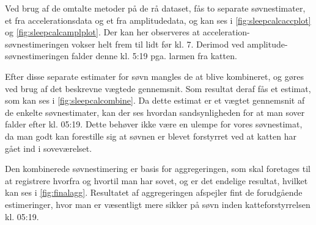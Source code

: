 Ved brug af de omtalte metoder på de rå dataset, fås to separate søvnestimater, et fra accelerationsdata og et fra amplitudedata, og kan ses i \cref{fig:sleepcalcaccplot} og \cref{fig:sleepcalcamplplot}.
Der kan her observeres at acceleration-søvnestimeringen vokser helt frem til lidt før kl. 7.
Derimod ved amplitude-søvnestimeringen falder denne kl. 5:19 pga. larmen fra katten.

Efter disse separate estimater for søvn mangles de at blive kombineret, og gøres ved brug af det beskrevne vægtede gennemsnit.
Som resultat deraf fås et estimat, som kan ses i \cref{fig:sleepcalcombine}.
Da dette estimat er et vægtet gennemsnit af de enkelte søvnestimater, kan der ses hvordan sandsynligheden for at man sover falder efter kl. 05:19.
Dette behøver ikke være en ulempe for vores søvnestimat, da man godt kan forestille sig at søvnen er blevet forstyrret ved at katten har gået ind i soveværelset.

Den kombinerede søvnestimering er basis for aggregeringen, som skal foretages til at registrere hvorfra og hvortil man har sovet, og er det endelige resultat, hvilket kan ses i \cref{fig:finalagg}.
Resultatet af aggregeringen afspejler fint de forudgående estimeringer, hvor man er væsentligt mere sikker på søvn inden katteforstyrrelsen kl. 05:19.